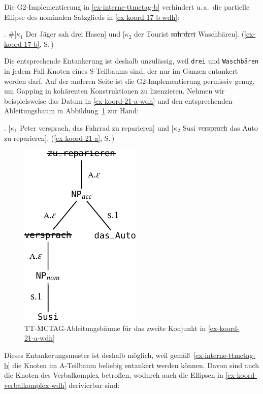 Die G2-Implementierung in \ref{ex-interne-ttmctag-b} verhindert u.\,a.\ die partielle Ellipse des nominalen Satzglieds in \ref{ex-koord-17-b-wdh}:

\ex. \#[$\kappa_1$ Der Jäger sah drei Hasen] und [$\kappa_2$ der Tourist \sout{sah drei} Waschbären]. \hfill
(\ref{ex-koord-17-b}, S.\,\pageref{ex-koord-17-b})\label{ex-koord-17-b-wdh}

Die entsprechende Entankerung ist deshalb unzulässig, weil {\tt drei} und {\tt Waschbä\-ren} in jedem Fall Knoten eines S-Teilbaums sind, der nur im Ganzen entankert werden darf. Auf der  anderen Seite ist die G2-Implementierung permissiv genug, um Gapping in kohärenten Konstruktionen zu lizenzieren. Nehmen wir beispielsweise das Datum in \ref{ex-koord-21-a-wdh} und den entsprechenden Ableitungsbaum in Abbildung~\ref{fig-deanchoring-koord-18} zur Hand: 

\ex. \label{ex-koord-21-a-wdh} [$\kappa_1$ Peter versprach, das Fahrrad zu reparieren] und [$\kappa_2$ Susi \sout{versprach} das Auto \sout{zu reparieren}]. \hfill (\ref{ex-koord-21-a}, S.\,\pageref{ex-koord-21-a})

\begin{figure}[t]
\centering
\includegraphics{graphics/abb827.pdf}
\caption{\label{fig-deanchoring-koord-18}TT-MCTAG-Ableitungsbäume für das zweite Konjunkt in \ref{ex-koord-21-a-wdh}}
\end{figure}
Dieses Entankerungsmuster ist deshalb möglich, weil gemä\ss\ \ref{ex-interne-ttmctag-b} die Knoten im A-Teilbaum beliebig entankert werden können. Davon sind auch die Knoten des Verbalkomplex betroffen, wodurch auch die Ellipsen in \ref{ex-koord-verbalkomplex-wdh} derivierbar sind:   

